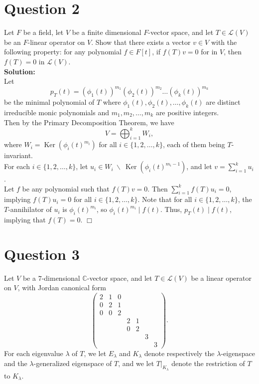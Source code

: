 \documentclass[12pt]{article}
\DeclareMathOperator{\Ker}{Ker}
\begin{document}
\newpage

\section*{Question 2}
Let $F$ be a field, let $V$ be a finite dimensional $F$-vector space, and let $T \in \mathcal{L}(V)$ be an $F$-linear operator on $V$. Show that there exists a vector $v \in V$ with the following property: for any polynomial $f \in F[t]$, if $f(T)v = 0$ for in $V$, then $f(T) = 0$ in $\mathcal{L}(V)$. \\

\noindent \textbf{Solution:} \\
Let \[p_T(t) = (\phi_1(t))^{m_1}(\phi_2(t))^{m_2}\dots(\phi_k(t))^{m_k}\] be the minimal polynomial of $T$ where $\phi_1(t), \phi_2(t),\dots, \phi_k(t)$ are distinct irreducible monic polynomials and $m_1, m_2, \dots, m_k$ are positive integers. \\
Then by the Primary Decomposition Theorem, we have \[V = \bigoplus_{i=1}^k W_i,\] where $W_i = \Ker(\phi_i(t)^{m_i})$ for all $i \in \{1, 2, \dots, k\}$, each of them being $T$-invariant. \\
For each $i \in \{1, 2, \dots, k\}$, let $u_i \in W_i \ \backslash \ \Ker(\phi_i(t)^{m_i-1})$, and let $\displaystyle v = \sum_{i=1}^k u_i$. \\
Let $f$ be any polynomial such that $f(T)v = 0$. Then $\displaystyle \sum_{i=1}^k f(T)u_i = 0$, implying $f(T)u_i = 0$ for all $i \in \{1, 2, \dots, k\}$. Note that for all $i \in \{1, 2, \dots, k\}$, the $T$-annihilator of $u_i$ is $\phi_i(t)^{m_i}$, so $\phi_i(t)^{m_i} \mid f(t)$. Thus, $p_T(t) \mid f(t)$, implying that $f(T) = 0$. \hfill $\Box$

\newpage

\section*{Question 3}
Let $V$ be a $7$-dimensional $\mathbb{C}$-vector space, and let $T \in \mathcal{L}(V)$ be a linear operator on $V$, with Jordan canonical form \[
\begin{pmatrix}
    2 & 1 & 0 & & & & \\
    0 & 2 & 1 & & & & \\
    0 & 0 & 2 & & & & \\
     & & & 2 & 1 & & \\
     & & & 0 & 2 & & \\
     & & & & & 3 & \\
     & & & & & & 3
\end{pmatrix}.
\]
For each eigenvalue $\lambda$ of $T$, we let $E_{\lambda}$ and $K_{\lambda}$ denote respectively the $\lambda$-eigenspace and the $\lambda$-generalized eigenspace of $T$, and we let $T|_{K_{\lambda}}$ denote the restriction of $T$ to $K_{\lambda}$. \\
\end{document}
